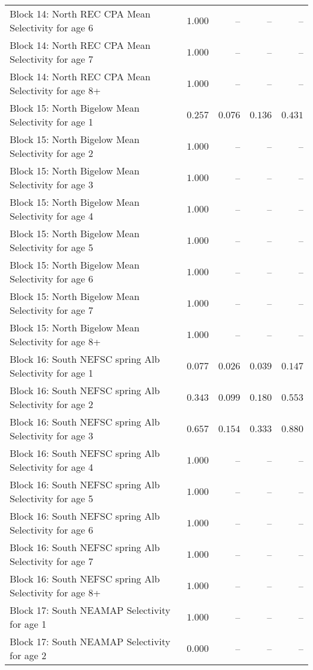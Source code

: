 \documentclass[
]{article}
\begin{document}
\begin{landscape}
\begin{longtable}[t]{lrrrr}
Block 14: North REC CPA Mean Selectivity for age 6 & $1.000$ & -- & -- & --\\
Block 14: North REC CPA Mean Selectivity for age 7 & $1.000$ & -- & -- & --\\
Block 14: North REC CPA Mean Selectivity for age 8+ & $1.000$ & -- & -- & --\\
Block 15: North Bigelow Mean Selectivity for age 1 & $0.257$ & $0.076$ & $0.136$ & $0.431$\\
\addlinespace
Block 15: North Bigelow Mean Selectivity for age 2 & $1.000$ & -- & -- & --\\
Block 15: North Bigelow Mean Selectivity for age 3 & $1.000$ & -- & -- & --\\
Block 15: North Bigelow Mean Selectivity for age 4 & $1.000$ & -- & -- & --\\
Block 15: North Bigelow Mean Selectivity for age 5 & $1.000$ & -- & -- & --\\
Block 15: North Bigelow Mean Selectivity for age 6 & $1.000$ & -- & -- & --\\
\addlinespace
Block 15: North Bigelow Mean Selectivity for age 7 & $1.000$ & -- & -- & --\\
Block 15: North Bigelow Mean Selectivity for age 8+ & $1.000$ & -- & -- & --\\
Block 16: South NEFSC spring Alb Selectivity for age 1 & $0.077$ & $0.026$ & $0.039$ & $0.147$\\
Block 16: South NEFSC spring Alb Selectivity for age 2 & $0.343$ & $0.099$ & $0.180$ & $0.553$\\
Block 16: South NEFSC spring Alb Selectivity for age 3 & $0.657$ & $0.154$ & $0.333$ & $0.880$\\
\addlinespace
Block 16: South NEFSC spring Alb Selectivity for age 4 & $1.000$ & -- & -- & --\\
Block 16: South NEFSC spring Alb Selectivity for age 5 & $1.000$ & -- & -- & --\\
Block 16: South NEFSC spring Alb Selectivity for age 6 & $1.000$ & -- & -- & --\\
Block 16: South NEFSC spring Alb Selectivity for age 7 & $1.000$ & -- & -- & --\\
Block 16: South NEFSC spring Alb Selectivity for age 8+ & $1.000$ & -- & -- & --\\
\addlinespace
Block 17: South NEAMAP Selectivity for age 1 & $1.000$ & -- & -- & --\\
Block 17: South NEAMAP Selectivity for age 2 & $0.000$ & -- & -- & --\\

\end{longtable}
\end{landscape}
\end{document}
